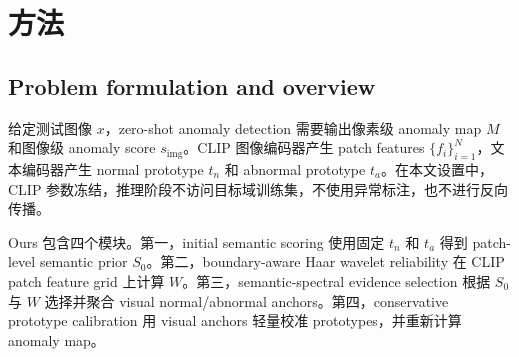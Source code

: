 \documentclass[10pt,a4paper,fontset=none]{ctexart}
\begin{document}
\begin{table}[t]
\centering
\caption{与最相关方向的定位比较。}
\label{tab:closest_work}
\end{table}

\section{方法}

\subsection{Problem formulation and overview}

给定测试图像 $x$，zero-shot anomaly detection 需要输出像素级 anomaly map $M$ 和图像级 anomaly score $s_{\mathrm{img}}$。CLIP 图像编码器产生 patch features $\{f_i\}_{i=1}^{N}$，文本编码器产生 normal prototype $t_n$ 和 abnormal prototype $t_a$。在本文设置中，CLIP 参数冻结，推理阶段不访问目标域训练集，不使用异常标注，也不进行反向传播。

Ours 包含四个模块。第一，initial semantic scoring 使用固定 $t_n$ 和 $t_a$ 得到 patch-level semantic prior $S_0$。第二，boundary-aware Haar wavelet reliability 在 CLIP patch feature grid 上计算 $W$。第三，semantic-spectral evidence selection 根据 $S_0$ 与 $W$ 选择并聚合 visual normal/abnormal anchors。第四，conservative prototype calibration 用 visual anchors 轻量校准 prototypes，并重新计算 anomaly map。
\end{document}
